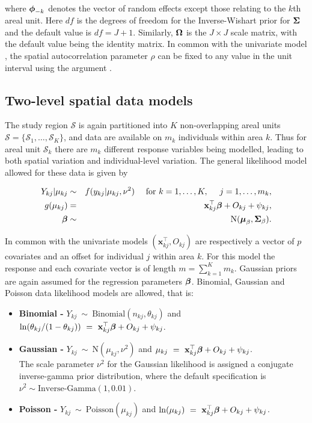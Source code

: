 \documentclass[article,shortnames,nojss]{jss}
\newcommand{\bd}[1]{\ensuremath{\mbox{\boldmath $#1$}}}
\begin{document}
where $\bd{\phi}_{-k}$ denotes the vector of random effects except those relating to the $k$th areal unit. Here $df$ is the degrees of freedom for the Inverse-Wishart prior for $\bd{\Sigma}$ and the default value is $df=J+1$. Similarly,  $\bd{\Omega}$ is the $J\times J$ scale matrix, with the default value being the identity matrix. In common with the univariate model , the spatial autocorrelation parameter $\rho$ can be fixed to any value in the unit interval using the argument .





\subsection{Two-level spatial data models}
The study region $\mathcal{S}$ is again partitioned into $K$ non-overlapping areal units $\mathcal{S}=\{\mathcal{S}_{1},\ldots,\mathcal{S}_{K}\}$, and data are available on $m_{k}$ individuals within area $k$. Thus for areal unit $\mathcal{S}_{k}$ there are $m_{k}$ different response variables being modelled, leading to both spatial variation and individual-level variation. The general likelihood model allowed for these data is given by

\begin{eqnarray}
Y_{kj}|\mu_{kj}&\sim&f(y_{kj}|\mu_{kj}, \nu^2)~~~~\mbox{for }k=1,\ldots,K,~~~~ j=1,\ldots,m_k,\label{equation two level likelihood}\\
g(\mu_{kj})&=& \mathbf{x}_{kj}^{\top}\bd{\beta} + O_{kj} + \psi_{kj} ,\nonumber\\
\bd{\beta}&\sim&\mbox{N}(\bd{\mu}_{\beta}, \bd{\Sigma}_{\beta}).\nonumber
\end{eqnarray}

In common with the univariate models $(\mathbf{x}_{kj}^{\top}, O_{kj})$ are respectively a vector of $p$ covariates and an offset for individual $j$ within area $k$. For this model the response and each covariate vector is of length $m=\sum_{k=1}^{K}m_k$. Gaussian priors are again assumed for the regression parameters $\bd{\beta}$. Binomial, Gaussian and Poisson data likelihood models are allowed, that is:

\begin{itemize}
\item \textbf{Binomial - } $Y_{kj}~\sim~\mbox{Binomial}(n_{kj}, \theta_{kj})$ and $\ln(\theta_{kj}/(1-\theta_{kj}))~=~\mathbf{x}_{kj}^{\top}\bd{\beta} + O_{kj} + \psi_{kj}$. 

\item \textbf{Gaussian - } $Y_{kj}~\sim~\mbox{N}(\mu_{kj}, \nu^{2})$ and $\mu_{kj}~=~\mathbf{x}_{kj}^{\top}\bd{\beta} + O_{kj} + \psi_{kj}$.\\

The scale parameter $\nu^2$ for the Gaussian likelihood is assigned a conjugate inverse-gamma prior distribution,  where the default specification is $\nu^{2}\sim\mbox{Inverse-Gamma}(1, 0.01)$.

\item \textbf{Poisson - } $Y_{kj}~\sim~\mbox{Poisson}(\mu_{kj})$ and $\ln(\mu_{kj})~=~\mathbf{x}_{kj}^{\top}\bd{\beta} + O_{kj} + \psi_{kj}$. 
\end{itemize}
\end{document}
